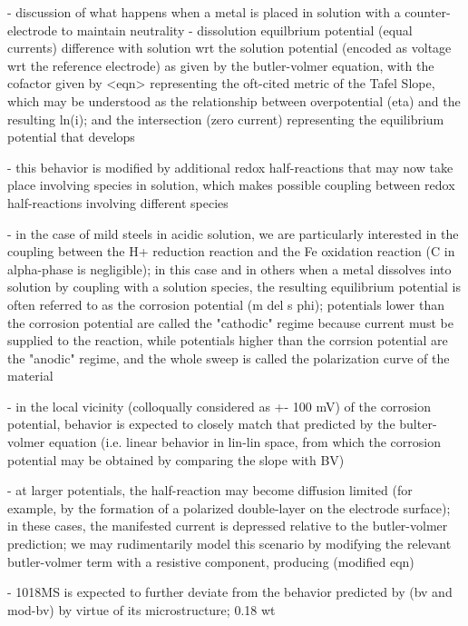 - discussion of what happens when a metal is placed in solution with a counter-electrode to maintain neutrality - dissolution equilbrium potential (equal currents) difference with solution wrt the solution potential (encoded as voltage wrt the reference electrode) as given by the butler-volmer equation, with the cofactor given by <eqn> representing the oft-cited metric of the Tafel Slope, which may be understood as the relationship between overpotential (eta) and the resulting ln(i); and the intersection (zero current) representing the equilibrium potential that develops

- this behavior is modified by additional redox half-reactions that may now take place involving species in solution, which makes possible coupling between redox half-reactions involving different species

- in the case of mild steels in acidic solution, we are particularly interested in the coupling between the H+ reduction reaction and the Fe oxidation reaction (C in alpha-phase is negligible); in this case and in others when a metal dissolves into solution by coupling with a solution species, the resulting equilibrium potential is often referred to as the corrosion potential (m del s phi); potentials lower than the corrosion potential are called the "cathodic" regime because current must be supplied to the reaction, while potentials higher than the corrsion potential are the "anodic" regime, and the whole sweep is called the polarization curve of the material

- in the local vicinity (colloqually considered as +- 100 mV) of the corrosion potential, behavior is expected to closely match that predicted by the bulter-volmer equation (i.e. linear behavior in lin-lin space, from which the corrosion potential may be obtained by comparing the slope with BV)

- at larger potentials, the half-reaction may become diffusion limited (for example, by the formation of a polarized double-layer on the electrode surface); in these cases, the manifested current is depressed relative to the butler-volmer prediction; we may rudimentarily model this scenario by modifying the relevant butler-volmer term with a resistive component, producing (modified eqn)

- 1018MS is expected to further deviate from the behavior predicted by (bv and mod-bv) by virtue of its microstructure; 0.18 wt%

